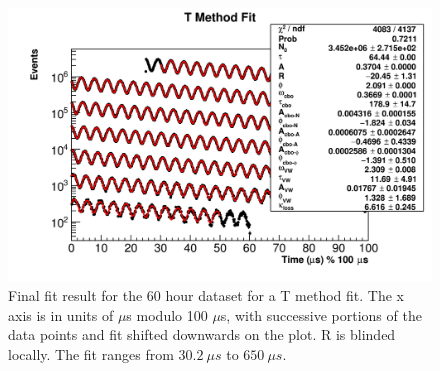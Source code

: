	\begin{figure}[]
		\centering
		\includegraphics[width=\textwidth]{TMethod_moduloPlot.png}
	    \caption[TMethod_moduloPlot]{Final fit result for the 60 hour dataset for a T method fit. The x axis is in units of $\mu$s modulo 100 $\mu$s, with successive portions of the data points and fit shifted downwards on the plot. R is blinded locally. The fit ranges from $\SI{30.2}{\mu s}$ to $\SI{650}{\mu s}$.}
	    \label{fig:TMethod_moduloPlot}
	\end{figure}

